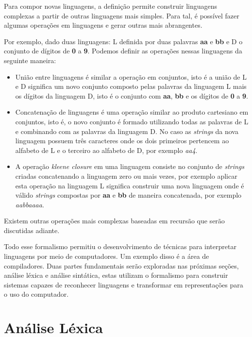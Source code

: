 Para compor novas linguagens, a definição permite construir linguagens complexas a partir de
outras linguagens mais simples. Para tal, é possível fazer algumas operações em linguagens
e gerar outras mais abrangentes.

Por exemplo, dado duas linguagens: L definida por duas palavras \textbf{aa} e \textbf{bb} e
D o conjunto de dígitos de \textbf{0} a \textbf{9}. Podemos definir as operações nessas 
linguagens da seguinte maneira:

\begin{itemize} 
    \item União entre linguagens é similar a operação em conjuntos, isto é a união de L e D significa
    um novo conjunto composto pelas palavras da linguagem L mais os dígitos da linguagem D, isto é
    o conjunto com \textbf{aa}, \textbf{bb} e os dígitos de \textbf{0} a \textbf{9}.
    \item Concatenação de linguagens é uma operação similar ao produto cartesiano em conjuntos,
    isto é, o novo conjunto é formado utilizando todas as palavras de L e combinando com as
    palavras da linguagem D. No caso as \textit{strings} da nova linguagem possuem três caracteres
    onde os dois primeiros pertencem ao alfabeto de L e o terceiro ao alfabeto de D, por exemplo
    \textit{aa4}.
    \item A operação \textit{kleene closure} em uma linguagem consiste no conjunto de \textit{strings} criadas 
    concatenando a linguagem zero ou mais vezes, por exemplo aplicar esta operação na 
    linguagem L significa construir uma nova linguagem onde é válido \textit{strings} compostas por
    \textbf{aa} e \textbf{bb} de maneira concatenada, por exemplo \textit{aabbaaaa}.
\end{itemize}

Existem outras operações mais complexas baseadas em recursão que serão discutidas adiante.

Todo esse formalismo permitiu o desenvolvimento de técnicas para interpretar linguagens por meio de computadores.
Um exemplo disso é a área de compiladores. Duas partes fundamentais serão exploradas nas próximas
seções, análise léxica e análise sintática, estas utilizam o formalismo para construir sistemas capazes 
de reconhecer linguagens e transformar em representações para o uso do computador.

\section{Análise Léxica}

